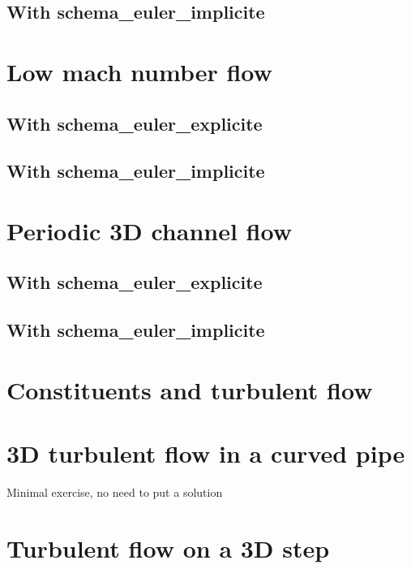 \documentclass[english]{article}
\begin{document}
\subsection{With schema\_euler\_implicite}


\section{Low mach number flow}
\subsection{With schema\_euler\_explicite}

\subsection{With schema\_euler\_implicite}


\section{Periodic 3D channel flow}
\subsection{With schema\_euler\_explicite}

\subsection{With schema\_euler\_implicite}


\section{Constituents and turbulent flow}


\section{3D turbulent flow in a curved pipe}
Minimal exercise, no need to put a solution

\section{Turbulent flow on a 3D step}
\end{document}
